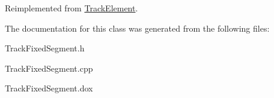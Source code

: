 Reimplemented from \hyperlink{classKite_1_1TrackElement_a38d30a241d00a14943a06401d0d12923}{Track\-Element}.



The documentation for this class was generated from the following files\-:\begin{DoxyCompactItemize}
\item 
Track\-Fixed\-Segment.\-h\item 
Track\-Fixed\-Segment.\-cpp\item 
Track\-Fixed\-Segment.\-dox\end{DoxyCompactItemize}
